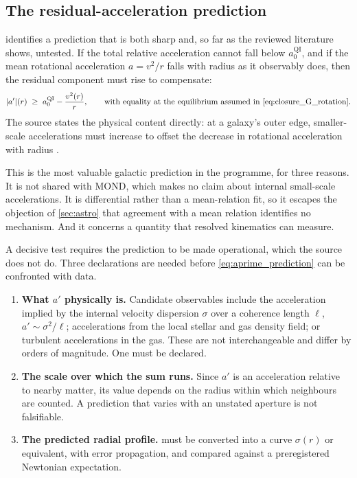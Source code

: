 \documentclass[11pt]{article}
\newcommand{\QI}{\mathrm{QI}}
\begin{document}
\subsection{The residual-acceleration prediction}
\label{sec:aprime_test}

 identifies a prediction that is both sharp and, so far as the reviewed literature shows, untested. If the total relative acceleration cannot fall below \(a_{0}^{\QI}\), and if the mean rotational acceleration \(a=v^{2}/r\) falls with radius as it observably does, then the residual component must rise to compensate:
\begin{equation}
    |a'|(r)\;\ge\;a_{0}^{\QI}-\frac{v^{2}(r)}{r},
    \qquad\text{with equality at the equilibrium assumed in \cref{eq:closure_G_rotation}.}
    \label{eq:aprime_prediction}
\end{equation}
The source states the physical content directly: at a galaxy's outer edge, smaller-scale accelerations must increase to offset the decrease in rotational acceleration with radius \cite{McCulloch2012}.

This is the most valuable galactic prediction in the programme, for three reasons. It is not shared with MOND, which makes no claim about internal small-scale accelerations. It is differential rather than a mean-relation fit, so it escapes the objection of \cref{sec:astro} that agreement with a mean relation identifies no mechanism. And it concerns a quantity that resolved kinematics can measure.

A decisive test requires the prediction to be made operational, which the source does not do. Three declarations are needed before \cref{eq:aprime_prediction} can be confronted with data.
\begin{enumerate}[leftmargin=1.55em]
    \item \textbf{What \(a'\) physically is.} Candidate observables include the acceleration implied by the internal velocity dispersion \(\sigma\) over a coherence length \(\ell\), \(a'\sim\sigma^{2}/\ell\); accelerations from the local stellar and gas density field; or turbulent accelerations in the gas. These are not interchangeable and differ by orders of magnitude. One must be declared.
    \item \textbf{The scale over which the sum runs.} Since \(a'\) is an acceleration relative to nearby matter, its value depends on the radius within which neighbours are counted. A prediction that varies with an unstated aperture is not falsifiable.
    \item \textbf{The predicted radial profile.}  must be converted into a curve \(\sigma(r)\) or equivalent, with error propagation, and compared against a preregistered Newtonian expectation.
\end{enumerate}
\end{document}
